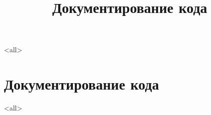 
\mode<all>{}

\title[Toolchain]{Документирование кода}


\begin{frame}
	\frametitle{}
	\titlepage
	\vspace{-0.5cm}
	\begin{center}
	\end{center}
\end{frame}

\begin{frame}
	\tableofcontents
\end{frame}




\section{Документирование кода}

\mode<all>{}


